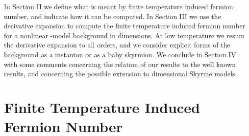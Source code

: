 \documentclass[a4paper,prd]{revtex4}
\begin{document}
In Section II we define what is meant by finite temperature induced fermion
number, and indicate how it can be computed. In Section III we use the derivative
expansion to compute the finite temperature induced fermion number for a nonlinear
\myHighlight{$\sigma$}\coordHE{}-model background in \coordHE{} dimensions. At low temperature we resum the
derivative  expansion to all orders, and we consider explicit forms of the background
as a \coordHE{} instanton or as a baby skyrmion. We conclude in Section IV
with some comments concerning the relation of our results to the well
known \coordHE{} results, and concerning the possible extension to \coordHE{}
dimensional Skyrme models.


\section{Finite Temperature Induced Fermion Number}
\end{document}
